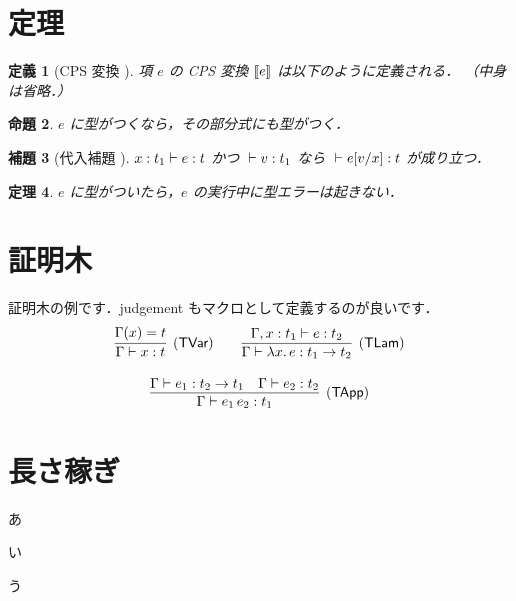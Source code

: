 \documentclass[twoside, twocolumn, a4paper]{jarticle}
\newtheorem{definition}{定義}
\newtheorem{proposition}[definition]{命題}
\newtheorem{lemma}[definition]{補題}
\newtheorem{theorem}[definition]{定理}
\begin{document}
\section{定理}\label{sec:theorem}
\begin{definition}[CPS 変換 \cite{Plotkin1975}]
\upshape %
項 $e$ の CPS 変換 $[\![{e]\!]}$ は以下のように定義される．
（中身は省略．）
\end{definition}

\begin{proposition}
$e$ に型がつくなら，その部分式にも型がつく．
\end{proposition}

\begin{lemma}[代入補題 \cite{WF1994}]
${x:t_1}\vdash{e}:{t}$ かつ ${}\vdash{v}:{t_1}$ なら
${}\vdash{e[v/x]}:{t}$ が成り立つ．
\end{lemma}

\begin{theorem}
$e$ に型がついたら，$e$ の実行中に型エラーは起きない．
\end{theorem}

\section{証明木}\label{sec:proof}
証明木の例です．judgement もマクロとして定義するのが良いです．
\[
\begin{array}{c}
\infer[(\textsf{TVar})]
      {\Judge{\Gamma}{x}{t}}
      {\Gamma(x)=t}
\qquad
\infer[(\textsf{TLam})]
      {\Judge{\Gamma}{\Lam{x}{e}}{\Arrow{t_1}{t_2}}}
      {\Judge{\Gamma,x:t_1}{e}{t_2}} \\
\ \\
\infer[(\textsf{TApp})]
      {\Judge{\Gamma}{\App{e_1}{e_2}}{t_1}}
      {\Judge{\Gamma}{e_1}{\Arrow{t_2}{t_1}}
      &\Judge{\Gamma}{e_2}{t_2}} \\
\end{array}
\]

\section{長さ稼ぎ}
あ

い

う
\end{document}
